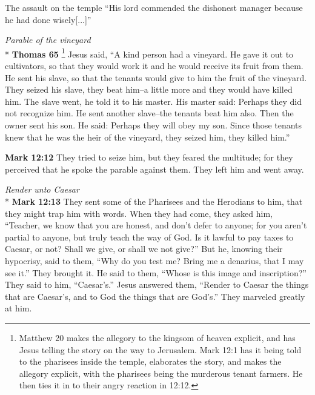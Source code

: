 \documentclass[10pt,twoside]{article} %
\newcommand{\quotesize}{\normalsize{}}
\newenvironment{quotetext}{\begingroup\quotesize}{\endgroup}
\newcommand{\intex}[1]{\index[texts]{#1}}
\newcommand{\bible}[2]{\begin{quotetext}\textbf{#1}\intex{#1} #2\end{quotetext}}
\newcommand{\gospelmark}[2]{\bible{Mark #1}{#2}}
\newcommand{\thomas}[2]{\bible{Thomas #1}{#2}}
\newcommand{\subhead}[1]{\emph{#1}\\*}
\begin{document}
\begin{section}{The assault on the temple}
{   ``His lord commended the dishonest manager because he had done wisely[...]''
}

\subhead{Parable of the vineyard}
\thomas{65}{\footnote{Matthew 20 makes the allegory to the kingsom of heaven explicit, and has Jesus telling the story on the way to Jerusalem.
Mark 12:1 has it being told to the pharisees inside the temple, 
elaborates the story, and makes the allegory explicit, with the pharisees being the murderous tenant farmers.
He then ties it in to their angry reaction in 12:12.}
Jesus said, ``A kind person had a vineyard. He gave it out to cultivators, so that
they would work it and he would receive its fruit from them. He sent
his slave, so that the tenants would give to him the fruit of the
vineyard. They seized his slave, they beat him--a little more and they
would have killed him. The slave went, he told it to his master. His
master said: Perhaps they did not recognize him. He sent another
slave--the tenants beat him also. Then the owner sent his son. He
said: Perhaps they will obey my son. Since those tenants knew that he
was the heir of the vineyard, they seized him, they killed
him.''
}

\gospelmark{12:12}{
 They tried to seize him, but they feared the multitude; for they perceived that he spoke the parable against them.
They left him and went away.
}

\subhead{Render unto Caesar}
\gospelmark{12:13}{
They sent some of the Pharisees and the Herodians to him, that they might trap him with words.   When they had come, they asked him, ``Teacher, we know that you are honest, and don't defer to anyone; for you aren't partial to anyone, but truly teach the way of God. Is it lawful to pay taxes to Caesar, or not?   Shall we give, or shall we not give?''
But he, knowing their hypocrisy, said to them, ``Why do you test me? Bring me a denarius, that I may see it.''
  They brought it.
He said to them, ``Whose is this image and inscription?''
They said to him, ``Caesar's.''
  Jesus answered them, ``Render to Caesar the things that are Caesar's, and to God the things that are God's.''
They marveled greatly at him. 
}


\end{section}
\end{document}
